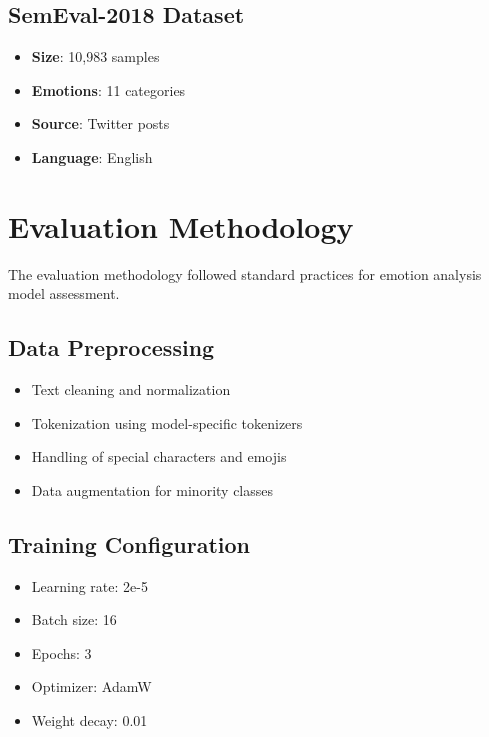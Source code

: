 \subsection{SemEval-2018 Dataset}
\begin{itemize}
\item \textbf{Size}: 10,983 samples
\item \textbf{Emotions}: 11 categories
\item \textbf{Source}: Twitter posts
\item \textbf{Language}: English
\end{itemize}


\section{Evaluation Methodology}

The evaluation methodology followed standard practices for emotion analysis model assessment.

\subsection{Data Preprocessing}
\begin{itemize}
\item Text cleaning and normalization
\item Tokenization using model-specific tokenizers
\item Handling of special characters and emojis
\item Data augmentation for minority classes
\end{itemize}

\subsection{Training Configuration}
\begin{itemize}
\item Learning rate: 2e-5
\item Batch size: 16
\item Epochs: 3
\item Optimizer: AdamW
\item Weight decay: 0.01
\end{itemize}

